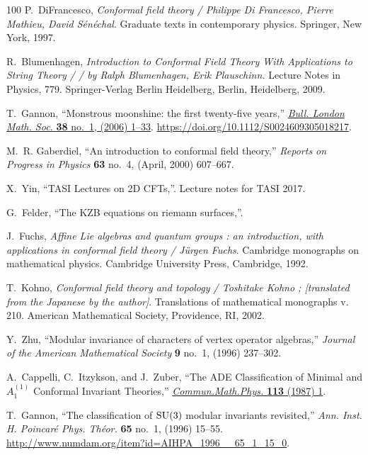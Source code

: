 \documentclass[11pt,a4paper,fontset=windows]{ctexart}
\numberwithin{equation}{section}
\begin{document}
\begin{thebibliography}{100}
P.~DiFrancesco, {\em Conformal field theory / Philippe Di Francesco, Pierre
  Mathieu, David Sénéchal}.
\newblock Graduate texts in contemporary physics. Springer, New York, 1997.

R.~Blumenhagen, {\em Introduction to Conformal Field Theory With Applications
  to String Theory / / by Ralph Blumenhagen, Erik Plauschinn.}
\newblock Lecture Notes in Physics, 779. Springer-Verlag Berlin Heidelberg,
  Berlin, Heidelberg, 2009.

T.~Gannon, ``Monstrous moonshine: the first twenty-five years,''
  \href{http://dx.doi.org/10.1112/S0024609305018217}{{\em Bull. London Math.
  Soc.} {\bfseries 38} no.~1, (2006) 1--33}.
  \url{https://doi.org/10.1112/S0024609305018217}.

M.~R. Gaberdiel, ``An introduction to conformal field theory,'' {\em Reports on
  Progress in Physics} {\bfseries 63} no.~4, (April, 2000) 607--667.

X.~Yin, ``{TASI Lectures on 2D CFTs},''. Lecture notes for TASI 2017.

G.~Felder, ``The {KZB} equations on riemann surfaces,''.

J.~Fuchs, {\em Affine Lie algebras and quantum groups : an introduction, with
  applications in conformal field theory / Jürgen Fuchs}.
\newblock Cambridge monographs on mathematical physics. Cambridge University
  Press, Cambridge, 1992.

T.~Kohno, {\em Conformal field theory and topology / Toshitake Kohno ;
  [translated from the Japanese by the author]}.
\newblock Translations of mathematical monographs v. 210. American Mathematical
  Society, Providence, RI, 2002.

Y.~Zhu, ``Modular invariance of characters of vertex operator algebras,'' {\em
  Journal of the American Mathematical Society} {\bfseries 9} no.~1, (1996)
  237--302.

A.~Cappelli, C.~Itzykson, and J.~Zuber, ``{The ADE Classification of Minimal
  and $A_1^{(1)}$ Conformal Invariant Theories},''
\href{http://dx.doi.org/10.1007/BF01221394}{{\em Commun.Math.Phys.} {\bfseries
  113} (1987) 1}.

T.~Gannon, ``The classification of {${\rm SU}(3)$} modular invariants
  revisited,'' {\em Ann. Inst. H. Poincar\'e Phys. Th\'eor.} {\bfseries 65}
  no.~1, (1996) 15--55.
  \url{http://www.numdam.org/item?id=AIHPA_1996__65_1_15_0}.


\end{thebibliography}
\end{document}
